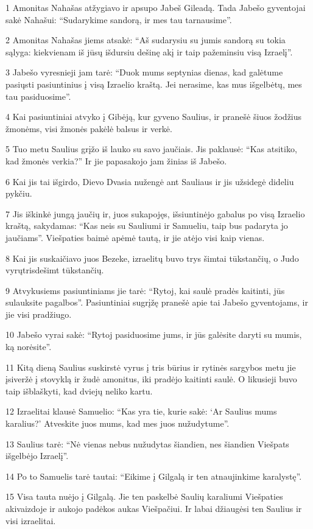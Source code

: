 \par 1 Amonitas Nahašas atžygiavo ir apsupo Jabeš Gileadą. Tada Jabešo gyventojai sakė Nahašui: “Sudarykime sandorą, ir mes tau tarnausime”. 
\par 2 Amonitas Nahašas jiems atsakė: “Aš sudarysiu su jumis sandorą su tokia sąlyga: kiekvienam iš jūsų išdursiu dešinę akį ir taip pažeminsiu visą Izraelį”. 
\par 3 Jabešo vyresnieji jam tarė: “Duok mums septynias dienas, kad galėtume pasiųsti pasiuntinius į visą Izraelio kraštą. Jei nerasime, kas mus išgelbėtų, mes tau pasiduosime”. 
\par 4 Kai pasiuntiniai atvyko į Gibėją, kur gyveno Saulius, ir pranešė šiuos žodžius žmonėms, visi žmonės pakėlė balsus ir verkė. 
\par 5 Tuo metu Saulius grįžo iš lauko su savo jaučiais. Jis paklausė: “Kas atsitiko, kad žmonės verkia?” Ir jie papasakojo jam žinias iš Jabešo. 
\par 6 Kai jis tai išgirdo, Dievo Dvasia nužengė ant Sauliaus ir jis užsidegė dideliu pykčiu. 
\par 7 Jis iškinkė jungą jaučių ir, juos sukapojęs, išsiuntinėjo gabalus po visą Izraelio kraštą, sakydamas: “Kas neis su Sauliumi ir Samueliu, taip bus padaryta jo jaučiams”. Viešpaties baimė apėmė tautą, ir jie atėjo visi kaip vienas. 
\par 8 Kai jis suskaičiavo juos Bezeke, izraelitų buvo trys šimtai tūkstančių, o Judo vyrų­trisdešimt tūkstančių. 
\par 9 Atvykusiems pasiuntiniams jie tarė: “Rytoj, kai saulė pradės kaitinti, jūs sulauksite pagalbos”. Pasiuntiniai sugrįžę pranešė apie tai Jabešo gyventojams, ir jie visi pradžiugo. 
\par 10 Jabešo vyrai sakė: “Rytoj pasiduosime jums, ir jūs galėsite daryti su mumis, ką norėsite”. 
\par 11 Kitą dieną Saulius suskirstė vyrus į tris būrius ir rytinės sargybos metu jie įsiveržė į stovyklą ir žudė amonitus, iki pradėjo kaitinti saulė. O likusieji buvo taip išblaškyti, kad dviejų neliko kartu. 
\par 12 Izraelitai klausė Samuelio: “Kas yra tie, kurie sakė: ‘Ar Saulius mums karalius?’ Atveskite juos mums, kad mes juos nužudytume”. 
\par 13 Saulius tarė: “Nė vienas nebus nužudytas šiandien, nes šiandien Viešpats išgelbėjo Izraelį”. 
\par 14 Po to Samuelis tarė tautai: “Eikime į Gilgalą ir ten atnaujinkime karalystę”. 
\par 15 Visa tauta nuėjo į Gilgalą. Jie ten paskelbė Saulių karaliumi Viešpaties akivaizdoje ir aukojo padėkos aukas Viešpačiui. Ir labai džiaugėsi ten Saulius ir visi izraelitai.



